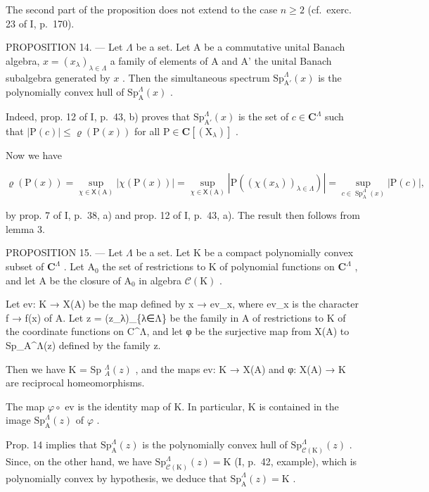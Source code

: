 The second part of the proposition does not extend to the case \(n \geqslant 2\) (cf.~exerc. 23 of I, p.~170).

PROPOSITION 14. --- Let \(\Lambda\) be a set. Let A be a commutative unital Banach algebra, \(x = (x_{\lambda})_{\lambda \in \Lambda}\) a family of elements of A and A' the unital Banach subalgebra generated by \(x\) . Then the simultaneous spectrum \(\mathrm{Sp}_{\mathrm{A}'}^{\Lambda}(x)\) is the polynomially convex hull of \(\mathrm{Sp}_{\mathrm{A}}^{\Lambda}(x)\) .

Indeed, prop. 12 of I, p.~43, b) proves that \(\mathrm{Sp}_{\mathrm{A}'}^{\Lambda}(x)\) is the set of \(c \in \mathbf{C}^{\Lambda}\) such that \(|\mathrm{P}(c)| \leqslant \varrho(\mathrm{P}(x))\) for all \(\mathrm{P} \in \mathbf{C}[(\mathrm{X}_{\lambda})]\) .

Now we have

\[
\varrho (\mathrm{P} (x)) = \sup _ {\chi \in \mathsf {X} (\mathrm{A})} | \chi (\mathrm{P} (x)) | = \sup _ {\chi \in \mathsf {X} (\mathrm{A})} | \mathrm{P} ((\chi (x _ {\lambda})) _ {\lambda \in \Lambda}) | = \sup _ {c \in \operatorname{Sp} _ {\mathrm{A}} ^ {\Lambda} (x)} | \mathrm{P} (c) |,
\]

by prop. 7 of I, p.~38, a) and prop. 12 of I, p.~43, a). The result then follows from lemma 3.

PROPOSITION 15. --- Let \(\Lambda\) be a set. Let K be a compact polynomially convex subset of \(\mathbf{C}^{\Lambda}\) . Let \(\mathrm{A}_0\) the set of restrictions to K of polynomial functions on \(\mathbf{C}^{\Lambda}\) , and let A be the closure of \(\mathrm{A}_0\) in algebra \(\mathcal{C}(\mathrm{K})\) .

Let ev: K → X(A) be the map defined by x → ev\_x, where ev\_x is the character f → f(x) of A. Let z = (z\_λ)\_\{λ∈Λ\} be the family in A of restrictions to K of the coordinate functions on C\^{}Λ, and let φ be the surjective map from X(A) to Sp\_A\^{}Λ(z) defined by the family z.

Then we have K = Sp \(_{A}^{\Lambda}(z)\) , and the maps ev: K → X(A) and φ: X(A) → K are reciprocal homeomorphisms.

The map \(\varphi \circ\) ev is the identity map of K. In particular, K is contained in the image \(\mathrm{Sp}_{\mathrm{A}}^{\Lambda}(z)\) of \(\varphi\) .

Prop. 14 implies that \(\mathrm{Sp}_{\mathrm{A}}^{\Lambda}(z)\) is the polynomially convex hull of \(\mathrm{Sp}_{\mathcal{C}(\mathrm{K})}^{\Lambda}(z)\) . Since, on the other hand, we have \(\mathrm{Sp}_{\mathcal{C}(\mathrm{K})}^{\Lambda}(z) = \mathrm{K}\) (I, p.~42, example), which is polynomially convex by hypothesis, we deduce that \(\mathrm{Sp}_{\mathrm{A}}^{\Lambda}(z) = \mathrm{K}\) .

